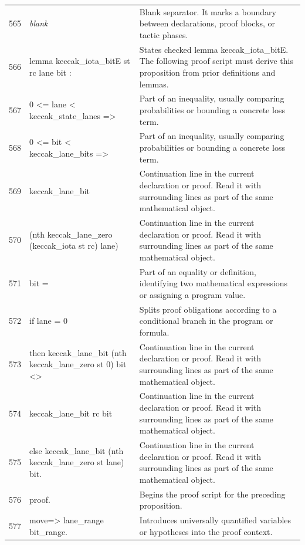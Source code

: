 \documentclass[10pt]{article}
\begin{document}
\begin{longtable}{r L{0.53\textwidth} L{0.37\textwidth}}
565 & {\ttfamily\scriptsize \emph{blank}} & Blank separator.  It marks a boundary between declarations, proof blocks, or tactic phases. \\
566 & {\ttfamily\scriptsize lemma keccak\_iota\_bitE st rc lane bit :} & States checked lemma keccak\_iota\_bitE.  The following proof script must derive this proposition from prior definitions and lemmas. \\
567 & {\ttfamily\scriptsize   0 <= lane < keccak\_state\_lanes =>} & Part of an inequality, usually comparing probabilities or bounding a concrete loss term. \\
568 & {\ttfamily\scriptsize   0 <= bit < keccak\_lane\_bits =>} & Part of an inequality, usually comparing probabilities or bounding a concrete loss term. \\
569 & {\ttfamily\scriptsize   keccak\_lane\_bit} & Continuation line in the current declaration or proof.  Read it with surrounding lines as part of the same mathematical object. \\
570 & {\ttfamily\scriptsize     (nth keccak\_lane\_zero (keccak\_iota st rc) lane)} & Continuation line in the current declaration or proof.  Read it with surrounding lines as part of the same mathematical object. \\
571 & {\ttfamily\scriptsize     bit =} & Part of an equality or definition, identifying two mathematical expressions or assigning a program value. \\
572 & {\ttfamily\scriptsize   if lane = 0} & Splits proof obligations according to a conditional branch in the program or formula. \\
573 & {\ttfamily\scriptsize   then keccak\_lane\_bit (nth keccak\_lane\_zero st 0) bit <>} & Continuation line in the current declaration or proof.  Read it with surrounding lines as part of the same mathematical object. \\
574 & {\ttfamily\scriptsize        keccak\_lane\_bit rc bit} & Continuation line in the current declaration or proof.  Read it with surrounding lines as part of the same mathematical object. \\
575 & {\ttfamily\scriptsize   else keccak\_lane\_bit (nth keccak\_lane\_zero st lane) bit.} & Continuation line in the current declaration or proof.  Read it with surrounding lines as part of the same mathematical object. \\
576 & {\ttfamily\scriptsize proof.} & Begins the proof script for the preceding proposition. \\
577 & {\ttfamily\scriptsize move=> lane\_range bit\_range.} & Introduces universally quantified variables or hypotheses into the proof context. \\

\end{longtable}
\end{document}
